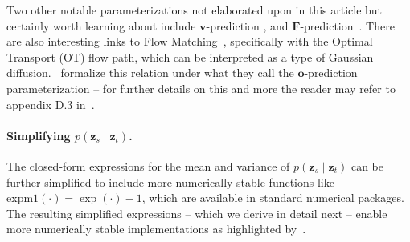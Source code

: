 %

Two other notable parameterizations not elaborated upon in this article but certainly worth learning about include $\mathbf{v}$-prediction \citep{salimans2022progressive}, and $\mathbf{F}$-prediction~\citep{karras2022elucidating}. There are also interesting links to Flow Matching~\citep{lipman2023flow}, specifically with the Optimal Transport (OT) flow path, which can be interpreted as a type of Gaussian diffusion.~\cite{kingma2023understanding} formalize this relation under what they call the $\mathbf{o}$-prediction parameterization -- for further details on this and more the reader may refer to appendix D.3 in~\cite{kingma2023understanding}.
%
\newpage
\paragraph{Simplifying $p(\mathbf{z}_s \mid \mathbf{z}_t)$.} The closed-form expressions for the mean and variance of $p(\mathbf{z}_s \mid \mathbf{z}_t)$ can be further simplified to include more numerically stable functions like $\mathrm{expm1}(\cdot) = \exp(\cdot) - 1$, which are available in standard numerical packages. The resulting simplified expressions -- which we derive in detail next -- enable more numerically stable implementations as highlighted by~\cite{kingma2021variational}.

